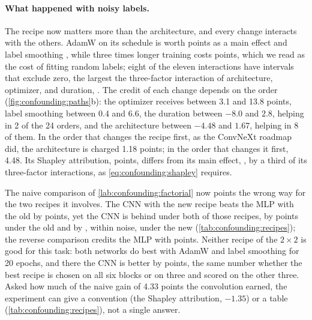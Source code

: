 \begin{refsection}
\paragraph{What happened with noisy labels.} The recipe now matters more than the architecture, and every change interacts with the others. AdamW on its schedule is worth  points as a main effect and label smoothing , while three times longer training costs  points, which we read as the cost of fitting random labels; eight of the eleven interactions have intervals that exclude zero, the largest the three-factor interaction of architecture, optimizer, and duration, . The credit of each change depends on the order (\cref{fig:confounding:paths}b): the optimizer receives between 3.1 and 13.8 points, label smoothing between 0.4 and 6.6, the duration between $-8.0$ and $2.8$, helping in 2 of the 24 orders, and the architecture between $-4.48$ and $1.67$, helping in 8 of them. In the order that changes the recipe first, as the ConvNeXt roadmap did, the architecture is charged 1.18 points; in the order that changes it first, 4.48. Its Shapley attribution,  points, differs from its main effect, , by a third of its three-factor interactions, as \eqref{eq:confounding:shapley} requires.

The naive comparison of \cref{lab:confounding:factorial} now points the wrong way for the two recipes it involves. The CNN with the new recipe beats the MLP with the old by  points, yet the CNN is behind under both of those recipes, by  points under the old and by , within noise, under the new (\cref{tab:confounding:recipes}); the reverse comparison credits the MLP with  points. Neither recipe of the $2\times2$ is good for this task: both networks do best with AdamW and label smoothing for 20 epochs, and there the CNN is better by  points, the same number whether the best recipe is chosen on all six blocks or on three and scored on the other three. Asked how much of the naive gain of 4.33 points the convolution earned, the experiment can give a convention (the Shapley attribution, $-1.35$) or a table (\cref{tab:confounding:recipes}), not a single answer.


\end{refsection}
